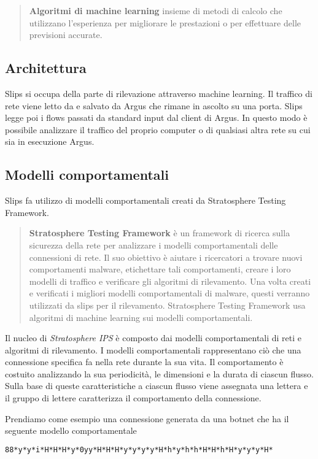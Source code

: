 \documentclass[../main.tex]{subfiles}
\begin{document}
\begin{verse}
\textbf{Algoritmi di machine learning}
insieme di metodi di calcolo che utilizzano l'esperienza per migliorare le prestazioni o per effettuare delle previsioni accurate.
\end{verse}

\subsection{Architettura}
Slips si occupa della parte di rilevazione attraverso machine learning. Il traffico di rete viene letto da e salvato da Argus che rimane in ascolto su una porta. Slips legge poi i flows passati da standard input dal client di Argus. 
In questo modo è possibile analizzare il traffico del proprio computer o di qualsiasi altra rete su cui sia in esecuzione Argus.

\subsection{Modelli comportamentali}
Slips fa utilizzo di modelli comportamentali creati da Stratosphere Testing Framework.

\begin{verse}
\textbf{Stratosphere Testing Framework}
è un framework di ricerca sulla sicurezza della rete per analizzare i modelli comportamentali delle connessioni di rete. Il suo obiettivo è aiutare i ricercatori a trovare nuovi comportamenti malware, etichettare tali comportamenti, creare i loro modelli di traffico e verificare gli algoritmi di rilevamento. Una volta creati e verificati i migliori modelli comportamentali di malware, questi verranno utilizzati da slips per il rilevamento. Stratosphere Testing Framework usa algoritmi di machine learning sui modelli comportamentali.
\end{verse}

Il nucleo di \textit{Stratosphere IPS} è composto dai modelli comportamentali di reti e algoritmi di rilevamento. I modelli comportamentali rappresentano ciò che una connessione specifica fa nella rete durante la sua vita. Il comportamento è costuito analizzando la sua periodicità, le dimensioni e la durata di ciascun flusso. Sulla base di queste caratteristiche a ciascun flusso viene assegnata una lettera e il gruppo di lettere caratterizza il comportamento della connessione.

Prendiamo come esempio una connessione generata da una botnet che ha il seguente modello comportamentale
\begin{lstlisting}[language=bash]
88*y*y*i*H*H*H*y*0yy*H*H*H*y*y*y*y*H*h*y*h*h*H*H*h*H*y*y*y*H*
\end{lstlisting}
\end{document}
